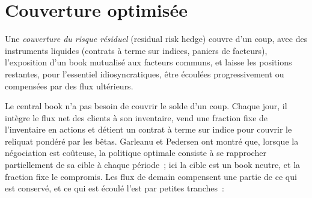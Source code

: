 \begin{omfigure}

\label{fig:s2:the-central-risk-book:desks}
\end{omfigure}

\section{Couverture optimisée}

\begin{definition}\label{def:s2:the-central-risk-book:residual}
Une \emph{couverture du risque résiduel} (residual risk hedge) couvre d'un coup, avec des instruments liquides (contrats à terme sur indices,
paniers de facteurs), l'exposition d'un book mutualisé aux facteurs communs, et laisse les positions restantes, pour l'essentiel idiosyncratiques, être écoulées progressivement ou compensées par des flux ultérieurs.
\end{definition}

Le central book n'a pas besoin de couvrir le solde d'un coup. Chaque jour, il intègre le flux net des clients à son inventaire, vend une fraction fixe de l'inventaire
en actions et détient un contrat à terme sur indice pour couvrir le reliquat pondéré par les bêtas. Garleanu et Pedersen ont montré que, lorsque la négociation est coûteuse, la politique
optimale consiste à se rapprocher partiellement de sa cible à chaque période~; ici la cible est un book neutre, et la fraction fixe le compromis. Les flux de demain compensent
une partie de ce qui est conservé, et ce qui est écoulé l'est par petites tranches~:

